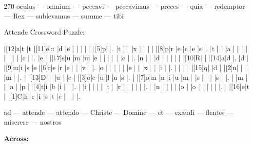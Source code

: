 \documentclass[12pt]{article}
\begin{document}
\pagestyle{fancy}
\fancyhf{}
\renewcommand{\headrulewidth}{0pt}
\renewcommand{\footrulewidth}{0pt}
\libertine
\renewcommand\PuzzleClueFont{\rm\normalsize}
\noindent\begin{rotate}{0}
\small
\end{rotate}
\hfill
\begin{rotate}{270}
\small oculus  --- omnium  --- peccavi  --- peccavimus  --- preces  --- quia  --- redemptor  --- Rex  --- sublevamus  --- summe  --- tibi 
\end{rotate}
\begin{center}
  \huge{Attende Crossword Puzzle:}
\end{center}
\vspace{1.5cm}
\begin{Puzzle}{15}{15}
  |[12]a|t   |t   |[11]e|n   |d   |e   |{}  |{}  |{}  |{}  |{}  |[5]p|{}  |.
  |t   |{}  |{}  |x   |{}  |{}  |{}  |{}  |[8]p|r   |e   |c   |e   |s   |.
  |t   |{}  |{}  |a   |{}  |{}  |{}  |{}  |{}  |{}  |{}  |{}  |c   |{}  |.
  |e   |{}  |[17]s|u   |m   |m   |e   |{}  |{}  |{}  |{}  |{}  |c   |{}  |.
  |n   |{}  |{}  |d   |{}  |{}  |{}  |{}  |{}  |[10]R|{}  |{}  |[14]a|d   |.
  |d   |{}  |[9]m|i   |s   |e   |[6]r|e   |r   |e   |{}  |{}  |v   |{}  |.
  |o   |{}  |{}  |{}  |{}  |{}  |e   |{}  |{}  |x   |{}  |{}  |i   |{}  |.
  |{}  |{}  |{}  |{}  |[15]q|{}  |d   |{}  |[2]n|{}  |{}  |{}  |m   |{}  |.
  |{}  |[13]D|{}  |{}  |u   |{}  |e   |{}  |[3]o|c   |u   |l   |u   |s   |.
  |{}  |[7]o|m   |n   |i   |u   |m   |{}  |s   |{}  |{}  |{}  |s   |{}  |.
  |{}  |m   |{}  |{}  |a   |{}  |p   |{}  |[4]t|i   |b   |i   |{}  |{}  |.
  |{}  |i   |{}  |{}  |{}  |{}  |t   |{}  |r   |{}  |{}  |{}  |{}  |{}  |.
  |{}  |n   |{}  |{}  |{}  |{}  |o   |{}  |o   |{}  |{}  |{}  |{}  |{}  |.
  |{}  |[16]e|t   |{}  |[1]C|h   |r   |i   |s   |t   |e   |{}  |{}  |{}  |.
\end{Puzzle}
\begin{rotate}{90}
\small 
ad  --- attende  --- attendo  --- Christe  --- Domine  --- et  --- exaudi  --- flentes  --- miserere  --- nostros
\end{rotate}
\hspace{-10pt}
\begin{PuzzleClues}{\textbf{Across:}}
\end{PuzzleClues}
\end{document}
